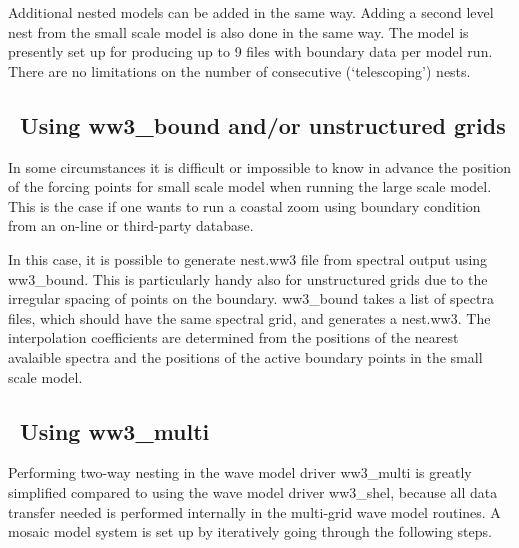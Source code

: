 \noindent
Additional nested models can be added in the same way. Adding a second level
nest from the small scale model is also done in the same way. The model is
presently set up for producing up to 9 files with boundary data per model
run. There are no limitations on the number of consecutive (`telescoping')
nests.

\vssub
\subsection{~Using {\file ww3\_bound} and/or unstructured grids}
\vssub

In some circumstances it is difficult or impossible to know in advance the position of the 
forcing points for small scale model when running the large scale model. This is the case if 
one wants to run a coastal zoom using boundary condition from an on-line or third-party database.

In this case, it is possible to generate  {\file nest.ww3} file from spectral output using 
{\code ww3\_bound}. This is particularly handy also for unstructured grids due to the irregular 
spacing of points on the boundary. {\code ww3\_bound} takes a list of spectra files, which should 
have the same spectral grid, and generates a  {\file nest.ww3}. The interpolation coefficients are 
determined from the positions of the nearest avalaible spectra and the positions of the active 
boundary points in the small scale model.

\vssub
\subsection{~Using {\file ww3\_multi}}
\vssub

Performing two-way nesting in the wave model driver {\file ww3\_multi} is
greatly simplified compared to using the wave model driver {\file ww3\_shel},
because all data transfer needed is performed internally in the multi-grid
wave model routines. A mosaic model system is set up by iteratively going
through the following steps.

